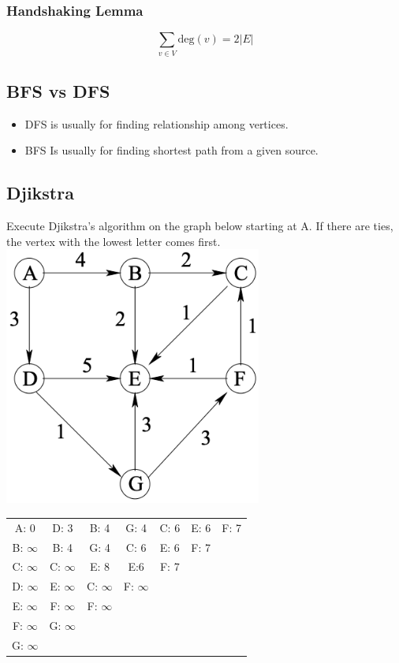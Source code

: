\documentclass{article}
\begin{document}
\begin{multicols*}{2}
    \subsubsection*{Handshaking Lemma}
    \begin{equation*}
        \sum_{v \in V} \text{deg}(v) = 2|E|
    \end{equation*}

    \subsection*{BFS vs DFS}
    \begin{itemize}
        \item DFS is usually for finding relationship among vertices.
        \item BFS Is usually for finding shortest path from a given source.
    \end{itemize}

    \subsection*{Djikstra}
    Execute Djikstra's algorithm on the graph below starting at A. If there are
    ties, the vertex with the lowest letter comes first.
    \includegraphics[width=0.5\columnwidth]{djikstra.png}
    \begin{tabular}{ccccccc}
        A: 0          & D: 3          & B: 4          & G: 4          & C: 6 &
        E: 6          & F: 7                                                   \\
        B: \(\infty\) & B: 4          & G: 4          & C: 6          & E: 6 &
        F: 7                                                                   \\
        C: \(\infty\) & C: \(\infty\) & E: 8          & E:6           & F: 7
        \\
        D: \(\infty\) & E: \(\infty\) & C: \(\infty\) & F: \(\infty\)
        \\
        E: \(\infty\) & F: \(\infty\) & F: \(\infty\)
        \\
        F: \(\infty\) & G: \(\infty\)
        \\
        G: \(\infty\)
    \end{tabular}
    \columnbreak

\end{multicols*}
\end{document}
